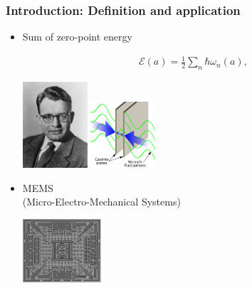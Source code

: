 \documentclass[dvipsnames,10pt]{beamer}
\begin{document}
\begin{frame}
    \frametitle{Introduction: Definition and application}

    \vspace{.3cm}
    \begin{itemize}
        \item  \begin{minipage}{5cm}
    
    Sum of zero-point energy
        
        \begin{align*}
    \mathcal{E}(a) = \frac{1}{2}\sum_{n}\hbar\omega_{n}(a),
\end{align*}

    \end{minipage}
    \begin{minipage}{5cm}
        \includegraphics[width=2.4cm]{figs/Hendrik_Casimir_(1958).jpg}
        \hspace{0.05cm}
        \includegraphics[width=2.4cm]{figs/Casimir_plates.png}
    \end{minipage}
    \vspace{0.3cm}
    \item \begin{minipage}{5cm}
    
    MEMS \\
    (Micro-Electro-Mechanical Systems)

    \end{minipage}
    \begin{minipage}{5cm}
    \centering
        \includegraphics[width=3cm]{figs/MEMS.jpg}
    \end{minipage}
    \end{itemize}

\end{frame}
\end{document}
